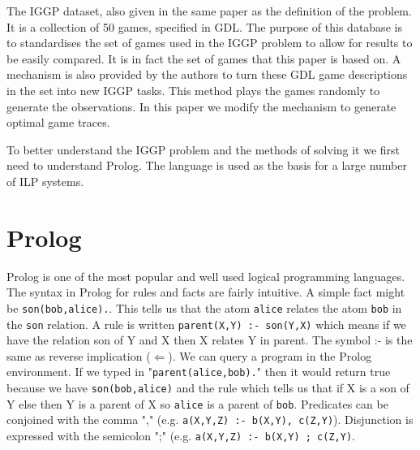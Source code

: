 The IGGP dataset, also given in the same paper as the definition of the problem. It is a collection of 50 games, specified in GDL. The purpose of this database is to standardises the set of games used in the IGGP problem to allow for results to be easily compared. It is in fact the set of games that this paper is based on.
A mechanism is also provided by the authors to turn these GDL game descriptions in the set into new IGGP tasks. This method plays the games randomly to generate the observations. In this paper we modify the mechanism to generate optimal game traces.

To better understand the IGGP problem and the methods of solving it we first need to understand Prolog. The language is used as the basis for a large number of ILP systems.


\section{Prolog}\label{sec:prolog}
Prolog is one of the most popular and well used logical programming languages. The syntax in Prolog for rules and facts are fairly intuitive. A simple fact might be \texttt{son(bob,alice).}. This tells us that the atom \texttt{alice} relates the atom \texttt{bob} in the \texttt{son} relation. A rule is written \texttt{parent(X,Y) :- son(Y,X)} which means if we have the relation son of Y and X then X relates Y in parent. The symbol :- is the same as reverse implication ($\Leftarrow$). We can query a program in the Prolog environment. If we typed in "\texttt{parent(alice,bob).}" then it would return true because we have \texttt{son(bob,alice)} and the rule which tells us that if X is a son of Y else then Y is a parent of X so \texttt{alice} is a parent of \texttt{bob}. Predicates can be conjoined with the comma "," (e.g. \texttt{a(X,Y,Z) :- b(X,Y), c(Z,Y)}). Disjunction is expressed with the semicolon ";" (e.g. \texttt{a(X,Y,Z) :- b(X,Y) ; c(Z,Y)}.


